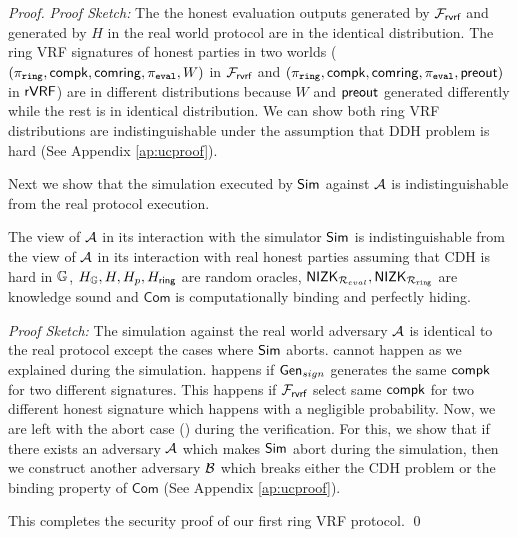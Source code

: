 \begin{proof}
	\textit{Proof Sketch:} 	The the honest evaluation outputs generated by $ \mathcal{F}_{\textsf{rvrf}} $ and generated by $ H $ in the real world protocol are in the identical distribution. The ring VRF signatures of honest parties in two worlds ($ (\pi_{\mathtt{ring}}, \mathsf{compk}, \mathsf{comring}, \pi_{\mathtt{eval}}, W) $ in $ \mathcal{F}_{\textsf{rvrf}} $ and $ (\pi_{\mathtt{ring}}, \mathsf{compk}, \mathsf{comring}, \pi_{\mathtt{eval}}, {\mathsf{preout}}) $ in $ {\mathsf{rVRF}} $) are in different distributions because $ W $ and $ {\mathsf{preout}} $ generated differently while the rest is in identical distribution. We can show both ring VRF distributions are indistinguishable under the assumption that DDH problem is hard (See Appendix \ref{ap:ucproof}).
	
	
	Next we show that the simulation executed by $ \mathsf{Sim} $ against $ \mathcal{A} $ is indistinguishable from the real protocol execution.
	
	\begin{lemma} \label{lem:simulation-ind}
		The view of $ \mathcal{A} $ in its interaction with the simulator $ \mathsf{Sim} $ is indistinguishable from the view of $ \mathcal{A} $ in its interaction with real honest parties assuming that CDH is hard in $ {\mathbb{G}} $, $H_{\mathbb{G}}, H, H_p, H_\mathsf{ring} $ are random oracles, $ {\mathsf{NIZK}}_{\mathcal{R}_{eval}}, {\mathsf{NIZK}}_{\mathcal{R}_{\mathtt{ring}}} $ are knowledge sound and $ \mathsf{Com} $ is computationally binding and perfectly hiding. 
	\end{lemma}

	\textit{Proof Sketch:} The  simulation against the real world adversary $ \mathcal{A} $ is identical to the real protocol except the cases where $ \mathsf{Sim} $ aborts.  cannot happen as we explained during the simulation.   happens if $ \mathsf{Gen}_{sign} $ generates the same $ \mathsf{compk} $ for two different signatures. This happens if $ \mathcal{F}_{\textsf{rvrf}} $  select same $ \mathsf{compk} $ for two different honest signature which happens with a negligible probability.
	Now, we are left with the abort case () during the verification.
	For this, we show that if there exists an adversary $ \mathcal{A} $ which makes $ \mathsf{Sim} $ abort during the simulation, then we construct another adversary $ \mathcal{B} $ which breaks either the CDH problem or the binding property of $ \mathsf{Com}$  (See Appendix \ref{ap:ucproof}).
	
	
	This completes the security proof of our first  ring VRF protocol. \qed
\end{proof}

